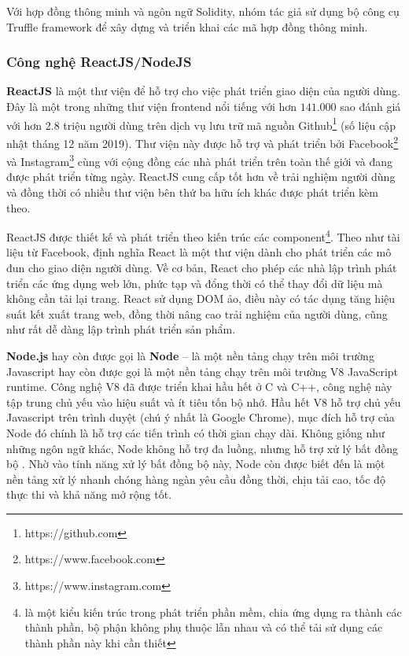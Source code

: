 \documentclass[../main-report.tex]{subfiles}
\begin{document}
Với hợp đồng thông minh và ngôn ngữ Solidity, nhóm tác giả sử dụng bộ công cụ Truffle framework để xây dựng và triển khai các mã hợp đồng thông minh.

\subsubsection{Công nghệ ReactJS/NodeJS}
\textbf{ReactJS} là một thư viện để hỗ trợ cho việc phát triển giao diện của người dùng. Đây là một trong những thư viện \gls{frontend} nổi tiếng với hơn $141.000$ sao đánh giá với hơn 2.8 triệu người dùng trên dịch vụ lưu trữ mã nguồn Github\footnote{https://github.com} (số liệu cập nhật tháng 12 năm 2019). Thư viện này được hỗ trợ và phát triển bởi Facebook\footnote{https://www.facebook.com} và Instagram\footnote{https://www.instagram.com} cùng với cộng đồng các nhà phát triển trên toàn thế giới và đang được phát triển từng ngày. ReactJS cung cấp tốt hơn về trải nghiệm người dùng và đồng thời có nhiều thư viện bên thứ ba hữu ích khác được phát triển kèm theo.

ReactJS được thiết kế và phát triển theo kiến trúc các component\footnote{là một kiểu kiến trúc trong phát triển phần mềm, chia ứng dụng ra thành các thành phần, bộ phận không phụ thuộc lẫn nhau và có thể tải sử dụng các thành phần này khi cần thiết}. Theo như tài liệu từ Facebook, định nghĩa React là một thư viện dành cho phát triển các mô đun cho giao diện người dùng. Về cơ bản, React cho phép các nhà lập trình phát triển các ứng dụng web lớn, phức tạp và đổng thời có thể thay đổi dữ liệu mà không cần tải lại trang. React sử dụng DOM ảo, điều này có tác dụng tăng hiệu suất kết xuất trang web, đồng thời nâng cao trải nghiệm của người dùng, cũng như rất dễ dàng lập trình phát triển sản phẩm.

\textbf{Node.js} hay còn được gọi là \textbf{Node} – là một nền tảng chạy trên môi trường Javascript hay còn được gọi là một nền tảng chạy trên môi trường V8 JavaScript runtime. Công nghệ V8 đã được triển khai hầu hết ở C và C++, công nghệ này tập trung chủ yếu vào hiệu suất và ít tiêu tốn bộ nhớ. Hầu hết V8 hỗ trợ chủ yếu Javascript trên trình duyệt (chú ý nhất là Google Chrome), mục đích hỗ trợ của Node đó chính là hỗ trợ các tiến trình có thời gian chạy dài. Không giống như những ngôn ngữ khác, Node không hỗ trợ đa luồng, nhưng hỗ trợ xử lý bất đồng bộ \cite{nodejs-performance}. Nhờ vào tính năng xử lý bất đồng bộ này, Node còn được biết đến là một nền tảng xử lý nhanh chóng hàng ngàn yêu cầu đồng thời, chịu tải cao, tốc độ thực thi và khả năng mở rộng tốt.
\end{document}
